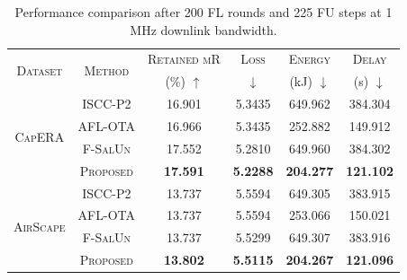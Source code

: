 \begin{table}[t]
\centering
\caption{Performance comparison after 200 FL rounds and 225 FU steps at 1 MHz downlink bandwidth.}
\label{tab:vlm_fl_fu_performance}
\footnotesize
\renewcommand{\arraystretch}{1.0}
\setlength{\tabcolsep}{3pt}

\begin{tabular}{c|c|c|c|c|c}
\toprule
\multirow{2}{*}{\textsc{Dataset}} & \multirow{2}{*}{\textsc{Method}}
        & \textsc{Retained mR} & \textsc{Loss} & \textsc{Energy} & \textsc{Delay} \\
        & & (\%) $\uparrow$ & $\downarrow$ & (kJ) $\downarrow$ & (s) $\downarrow$ \\
\midrule
\multirow{4}{*}{\textsc{CapERA}} & \textsc{ISCC-P2} & 16.901 & 5.3435 & 649.962 & 384.304 \\
 & \textsc{AFL-OTA} & 16.966 & 5.3435 & 252.882 & 149.912 \\
 & \textsc{F-SalUn} & 17.552 & 5.2810 & 649.960 & 384.302 \\
 & \textsc{Proposed} & \textbf{17.591} & \textbf{5.2288} & \textbf{204.277} & \textbf{121.102} \\
\midrule
\multirow{4}{*}{\textsc{AirScape}} & \textsc{ISCC-P2} & 13.737 & 5.5594 & 649.305 & 383.915 \\
 & \textsc{AFL-OTA} & 13.737 & 5.5594 & 253.066 & 150.021 \\
 & \textsc{F-SalUn} & 13.737 & 5.5299 & 649.307 & 383.916 \\
 & \textsc{Proposed} & \textbf{13.802} & \textbf{5.5115} & \textbf{204.267} & \textbf{121.096} \\
\bottomrule
\end{tabular}
\end{table}

